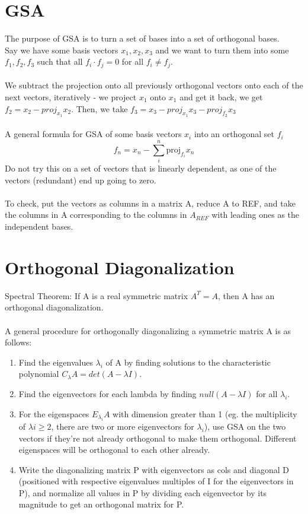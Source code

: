 \documentclass[10pt, twocolumn] {article}
\begin{document}
     \section{GSA}
     The purpose of GSA is to turn a set of bases into a set of orthogonal bases.\\
     Say we have some basis vectors $x_1, x_2, x_3$ and we want to turn them into some $f_1, f_2, f_3$ such that all $f_i \cdot f_j = 0$ for all $f_i \neq f_j$. \\\\We subtract the projection onto all previously orthogonal vectors onto each of the next vectors, iteratively - we project $x_1$ onto $x_1$ and get it back, we get $f_2 = x_2 - proj_{x_1}x_2$. Then, we take $f_3 = x_3 - proj_{x_1}x_3 - proj_{f_2}x_3$ \\\\
     A general formula for GSA of some basis vectors $x_i$ into an orthogonal set $f_i$
     $$f_n = x_n - \sum_i^n \text{proj}_{f_i}x_n$$
     Do not try this on a set of vectors that is linearly dependent, as one of the vectors (redundant) end up going to zero.\\\\ To check, put the vectors as columns in a matrix A, reduce A to REF, and take the columns in A corresponding to the columns in $A_{REF}$ with leading ones as the independent bases.
     \section{Orthogonal Diagonalization}
     Spectral Theorem: If A is a real symmetric matrix $A^T = A$, then A has an orthogonal diagonalization.\\\\
     A general procedure for orthogonally diagonalizing a symmetric matrix A is as follows:
     \begin{enumerate}
         \item Find the eigenvalues $\lambda_i$ of A by finding solutions to the characteristic polynomial $C_\lambda A = det (A-\lambda I)$.
         \item Find the eigenvectors for each lambda by finding $null(A-\lambda I)$ for all $\lambda_i.$
         \item For the eigenspaces $E_{\lambda_i}A$ with dimension greater than 1 (eg. the multiplicity of $\lambda i \geq 2$, there are two or more eigenvectors for $\lambda_i$), use GSA on the two vectors if they're not already orthogonal to make them orthogonal. Different eigenspaces will be orthogonal to each other already.
         \item Write the diagonalizing matrix P with eigenvectors as cols and diagonal D (positioned with respective eigenvalues multiples of I for the eigenvectors in P), and normalize all values in P by dividing each eigenvector by its magnitude to get an orthogonal matrix for P.
     \end{enumerate}
     
\end{document}

